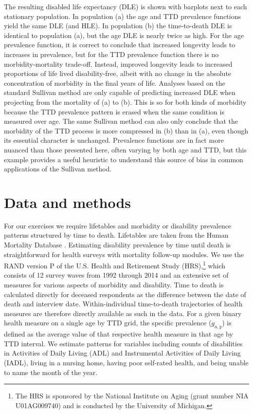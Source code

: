 \documentclass[12pt,oneside,letterpaper,doublespacing]{article}  %
\begin{document}
The resulting disabled life expectancy (DLE) is shown with
barplots next to each stationary population.
In population (a) the age and TTD prevalence functions yield
the same DLE (and HLE). In population (b) the time-to-death DLE is identical to
population (a), but the age DLE is nearly twice as high. For the
age prevalence function, it is correct to conclude that increased longevity leads to
increases in prevalence, but for the TTD prevalence function there is
no morbidity-mortality trade-off. Instead, improved longevity leads to increased proportions of life
lived disability-free, albeit with no change in the absolute concentration of morbidity in the final years of life. Analyses
based on the standard Sullivan method \citep{Sullivan1970} are only capable of
predicting increased DLE when projecting from the mortality of (a) to (b). This
is so for both kinds of morbidity because the TTD prevalence pattern
is erased when the same condition is measured over age. The same
Sullivan method can also only conclude that the morbidity of the TTD
process is more compressed in (b) than in (a), even though its essential
character is unchanged. Prevalence functions are in fact more nuanced than those
presented here, often varying by both age and TTD, but this example provides a useful heuristic to understand this source of bias in common applications of the Sullivan method.

\section{Data and methods}
\label{sec:datamethods}
For our exercises we require lifetables and morbidity or disability prevalence patterns structured by time to death. Lifetables are taken from the Human Mortality Database \citep{HMD2018}. Estimating disability prevalence by time until death is straightforward for health surveys with mortality follow-up modules. We use the RAND version P of the U.S. Health and Retirement Study (HRS),\footnote{The HRS is sponsored by the National Institute on Aging (grant number NIA U01AG009740) and is conducted by the University of Michigan.} which consists of 12 survey waves from 1992 through 2014 and an extensive set of measures for various aspects of morbidity and disability. Time to death is calculated directly for deceased respondents as the difference between the date of death and interview date. Within-individual time-to-death trajectories of health measures are therefore directly available as such in the data. For a given binary health measure on a single age by TTD grid, the specific prevalence ($g_{a,y}$) is defined as the average value of that respective health measure in that age by TTD interval. We estimate patterns for variables including
counts of disabilities in Activities of Daily Living (ADL) and
Instrumental Activities of Daily Living (IADL), living in a nursing home, having poor
self-rated health, and being unable to name the month of the year.
\end{document}

